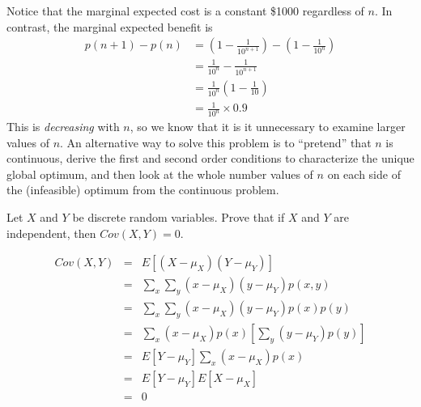 \documentclass[addpoints,12pt]{exam}
\begin{document}
\begin{questions}
\begin{solution}
Notice that the marginal expected cost is a constant \$1000 regardless of $n$.
In contrast, the marginal expected benefit is
\begin{align*}
  p(n+1) - p(n) &= \left( 1 - \frac{1}{10^{n+1}} \right) - \left( 1 - \frac{1}{10^{n}} \right) \\
  &= \frac{1}{10^{n}} - \frac{1}{10^{n+1}}\\
  &= \frac{1}{10^{n}}\left(1 - \frac{1}{10} \right) \\
  &= \frac{1}{10^n} \times 0.9
\end{align*}
This is \emph{decreasing} with $n$, so we know that it is it unnecessary to examine larger values of $n$.
An alternative way to solve this problem is to ``pretend'' that $n$ is continuous, derive the first and second order conditions to characterize the unique global optimum, and then look at the whole number values of $n$ on each side of the (infeasible) optimum from the continuous problem.

  \end{solution}



\question Let $X$ and $Y$ be discrete random variables.
Prove that if $X$ and $Y$ are independent, then $Cov(X,Y) = 0$. 
\begin{solution}
\begin{eqnarray*}
	Cov(X,Y) &=& E[(X-\mu_X)(Y-\mu_Y)]\\
	&=& \sum_x \sum_y (x - \mu_X)(y- \mu_Y)p(x,y)\\
	&=&\sum_x \sum_y (x - \mu_X)(y- \mu_Y)p(x)p(y) \\
	&=& \sum_x  (x - \mu_X)p(x)\left[ \sum_y (y- \mu_Y)p(y)\right] \\
	&=& E[Y- \mu_Y] \sum_x  (x - \mu_X)p(x)\\
	&=& E[Y- \mu_Y]E[X- \mu_X] \\
	&=& 0
\end{eqnarray*}
\end{solution}



\end{questions}
\end{document}
